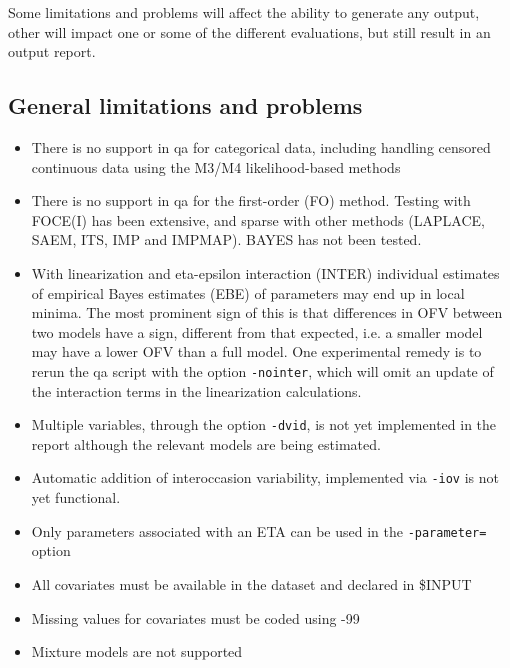 Some limitations and problems will affect the ability to generate any output, other will impact one or some of the different evaluations, but still result in an output report. 

\subsection{General limitations and problems}
\begin{itemize}
	\item There is no support in qa for categorical data, including handling censored continuous data using the M3/M4 likelihood-based methods
	\item There is no support in qa for the first-order (FO) method. Testing with FOCE(I) has been extensive, and sparse with other methods (LAPLACE, SAEM, ITS, IMP and IMPMAP). BAYES has not been tested. 
	\item With linearization and eta-epsilon interaction (INTER) individual estimates of empirical Bayes estimates (EBE) of parameters may end up in local minima. The most prominent sign of this is that differences in OFV between two models have a sign, different from that expected, i.e. a smaller model may have a lower OFV than a full model. One experimental remedy is to rerun the qa script with the option \verb|-nointer|, which will omit an update of the interaction terms in the linearization calculations.
	\item Multiple variables, through the option \verb|-dvid|, is not yet implemented in the report although the relevant models are being estimated.
	\item Automatic addition of interoccasion variability, implemented via \verb|-iov| is not yet functional.
	\item Only parameters associated with an ETA can be used in the \verb|-parameter=| option
    \item All covariates must be available in the dataset and declared in \$INPUT
    \item Missing values for covariates must be coded using -99
    \item Mixture models are not supported
\end{itemize}

